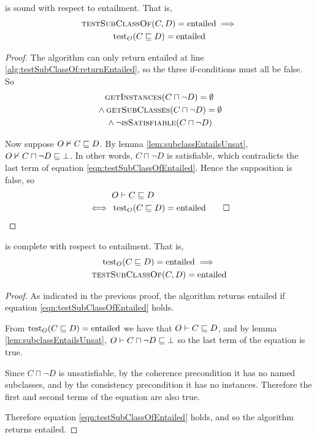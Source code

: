 \documentclass[paper.tex]{subfiles}
\begin{document}
\begin{proposition}
  \label{prop:testSubClassOfEntailedSound}
   is sound with respect to entailment.  That is,
  \begin{multline*}
    \Call{testSubClassOf}{C, D} = \entailed \implies \\
    \test_O(C \sqsubseteq D) = \entailed
  \end{multline*}
\end{proposition}
\begin{proof}
  The algorithm can only return entailed at line \ref{alg:testSubClassOf:returnEntailed}, so the three if-conditions must all be false.  So
  \begin{multline}
    \label{eqn:testSubClassOfEntailed}
    \Call{getInstances}{C \sqcap \neg D} = \emptyset \\
    {} \land \Call{getSubClasses}{C \sqcap \neg D} = \emptyset \\
    {} \land \lnot \Call{isSatisfiable}{C \sqcap \neg D}
  \end{multline}

  Now suppose $O \nvdash C \sqsubseteq D$.  By lemma \ref{lem:subclassEntailsUnsat}, $O \nvdash C \sqcap \neg D \sqsubseteq \bot$.  In other words, $C \sqcap \neg D$ is satisfiable, which contradicts the last term of equation \ref{eqn:testSubClassOfEntailed}.  Hence the supposition is false, so
  \begin{align*}
    & O \vdash C \sqsubseteq D \\
    \iff{}& \operatorname{test}_O(C \sqsubseteq D) = \mathrm{entailed}
    \qed
  \end{align*}
\end{proof}

\begin{proposition}
  \label{prop:testSubClassOfEntailedComplete}
   is complete with respect to entailment.  That is,
  \begin{multline*}
    \test_O(C \sqsubseteq D) = \entailed \implies \\
    \Call{testSubClassOf}{C, D} = \entailed
  \end{multline*}
\end{proposition}
\begin{proof}
  As indicated in the previous proof, the algorithm returns entailed if equation \ref{eqn:testSubClassOfEntailed} holds.

  From $\operatorname{test}_O(C \sqsubseteq D) = \mathrm{entailed}$ we have that $O \vdash C \sqsubseteq D$, and by lemma \ref{lem:subclassEntailsUnsat}, $O \vdash C \sqcap \neg D \sqsubseteq \bot$ so the last term of the equation is true.

  Since $C \sqcap \neg D$ is unsatisfiable, by the coherence precondition it has no named subclasses, and by the consistency precondition it has no instances.  Therefore the first and second terms of the equation are also true.

  Therefore equation \ref{eqn:testSubClassOfEntailed} holds, and so the algorithm returns entailed.
\end{proof}
\end{document}
